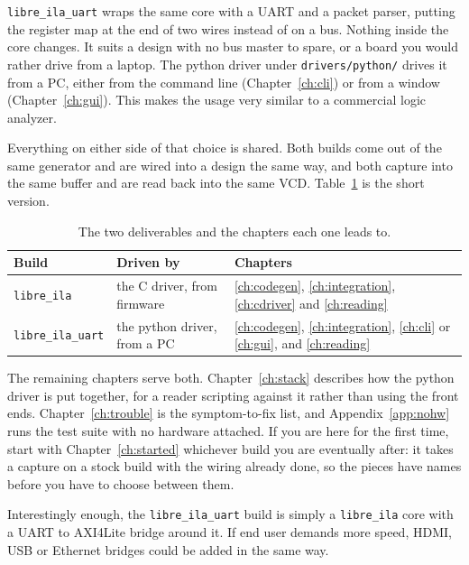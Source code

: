 \documentclass[../manual.tex]{subfiles}
\begin{document}
\texttt{libre\_ila\_uart} wraps the same core with a UART and a packet parser, putting the register map at the end of two wires instead of on a bus. Nothing inside the core changes. It suits a design with no bus master to spare, or a board you would rather drive from a laptop. The python driver under \texttt{drivers/python/} drives it from a PC, either from the command line (Chapter~\ref{ch:cli}) or from a window (Chapter~\ref{ch:gui}). This makes the usage very similar to a commercial logic analyzer.

Everything on either side of that choice is shared. Both builds come out of the same generator and are wired into a design the same way, and both capture into the same buffer and are read back into the same VCD. Table~\ref{tab:intro_paths} is the short version.

\begin{table}[H]
    \centering
    \begin{tabularx}{\textwidth}{|l|l|X|}
        \hline
        \rowcolor{gray!40} \textbf{Build} & \textbf{Driven by} & \textbf{Chapters} \\
        \hline
        \texttt{libre\_ila} & the C driver, from firmware & \ref{ch:codegen}, \ref{ch:integration}, \ref{ch:cdriver} and \ref{ch:reading} \\
        \hline
        \texttt{libre\_ila\_uart} & the python driver, from a PC & \ref{ch:codegen}, \ref{ch:integration}, \ref{ch:cli} or \ref{ch:gui}, and \ref{ch:reading} \\
        \hline
    \end{tabularx}
    \caption{The two deliverables and the chapters each one leads to.}
    \label{tab:intro_paths}
\end{table}

The remaining chapters serve both. Chapter~\ref{ch:stack} describes how the python driver is put together, for a reader scripting against it rather than using the front ends. Chapter~\ref{ch:trouble} is the symptom-to-fix list, and Appendix~\ref{app:nohw} runs the test suite with no hardware attached. If you are here for the first time, start with Chapter~\ref{ch:started} whichever build you are eventually after: it takes a capture on a stock build with the wiring already done, so the pieces have names before you have to choose between them.

Interestingly enough, the \texttt{libre\_ila\_uart} build is simply a \texttt{libre\_ila} core with a \ac{UART} to AXI4Lite bridge around it. If end user demands more speed, HDMI, USB or Ethernet bridges could be added in the same way.
\end{document}
